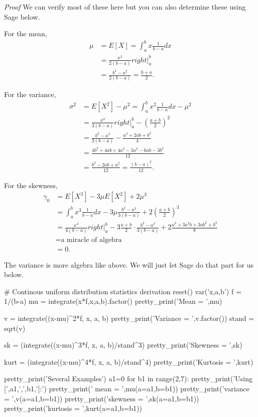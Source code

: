 \documentclass[10pt,]{book}
\makeatletter
\renewcommand*{\proofname}{Proof}
\renewenvironment{proof}[1][\proofname]{\par
  \pushQED{\qed}%
  \normalfont \topsep6\p@\@plus6\p@\relax
  \trivlist
  \item\relax
    {\itshape
    #1\@addpunct{.}}\hspace\labelsep\ignorespaces
}{%
  \popQED\endtrivlist\@endpefalse
}
\numberwithin{equation}{section}
\makeatother
\begin{document}
 \begin{proof}\hypertarget{proof-36}{}
\hypertarget{p-823}{}%
We can verify most of these here but you can also determine these using Sage below.%
\par
\hypertarget{p-824}{}%
For the mean,%
\begin{align*}
\mu & = E[X] = \int_a^b x \frac{1}{b-a} dx\\
& = \frac{x^2}{2(b-a)} right |_a^b\\
& = \frac{b^2-a^2}{2(b-a)} = \frac{b+a}{2}.
\end{align*}
%
\par
\hypertarget{p-825}{}%
For the variance,%
\begin{align*}
\sigma^2 & = E[X^2] - \mu^2 = \int_a^b x^2 \frac{1}{b-a} dx  - \mu^2\\
& = \frac{x^3}{3(b-a)} right |_a^b - \left ( \frac{a+b}{2} \right )^2\\
& = \frac{b^3-a^3}{3(b-a)} - \frac{a^2 + 2ab + b^2}{4}\\
& = \frac{4 b^2 + 4 ab + 4 a^2 - 3a^2 - 6 ab - 3b^2}{12}\\
& = \frac{b^2-2ab+a^2}{12} = \frac{(b-a)^2}{12}.
\end{align*}
%
\par
\hypertarget{p-826}{}%
For the skewness,%
\begin{align*}
\gamma_0 & = E[X^3] - 3 \mu E[X^2] + 2 \mu^3\\
& = \int_a^b x^3 \frac{1}{b-a} dx - 3 \mu \frac{b^3-a^3}{3(b-a)} + 2 \left ( \frac{a+b}{2} \right )^3\\
& = \frac{x^4}{4(b-a)} right |_a^b - 3 \frac{a+b}{2} \cdot \frac{b^3-a^3}{3(b-a)} + 2 \frac{a^3 + 3a^2 b + 3a b^2 + b^3}{8} \\
& = \text{a miracle of algebra}\\
& = 0.
\end{align*}
%
\par
\hypertarget{p-827}{}%
The variance is more algebra like above. We will just let Sage do that part for us below.%
\end{proof}
%
\par
\hypertarget{p-828}{}%
\leavevmode%
\begin{sageinput}
# Continous uniform distribution statistics derivation
reset()
var('x,a,b')
f = 1/(b-a)
mu = integrate(x*f,x,a,b).factor()
pretty_print('Mean = ',mu)

v = integrate((x-mu)^2*f, x, a, b)
pretty_print('Variance = ',v.factor())
stand = sqrt(v)

sk = (integrate((x-mu)^3*f, x, a, b)/stand^3)
pretty_print('Skewness =  ',sk)

kurt = (integrate((x-mu)^4*f, x, a, b)/stand^4)
pretty_print('Kurtosis = ',kurt)

pretty_print('Several Examples')
a1=0
for b1 in range(2,7):
    pretty_print('Using [',a1,',',b1,']:')
    pretty_print('    mean = ',mu(a=a1,b=b1))
    pretty_print('variance = ',v(a=a1,b=b1))
    pretty_print('skewness = ',sk(a=a1,b=b1))
    pretty_print('kurtosis = ',kurt(a=a1,b=b1))
\end{sageinput}
\end{document}
